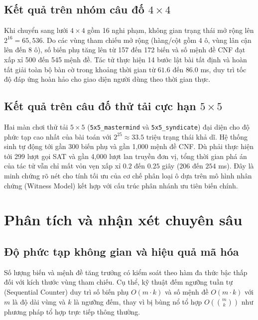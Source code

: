 \subsection{Kết quả trên nhóm câu đố $4 \times 4$}
\label{subsec:ket-qua-4x4}
Khi chuyển sang lưới $4 \times 4$ gồm 16 nghi phạm, không gian trạng thái mở rộng lên $2^{16} = 65,536$. Do các vùng tham chiếu mở rộng (hàng/cột gồm 4 ô, vùng lân cận lên đến 8 ô), số biến phụ tăng lên từ 157 đến 172 biến và số mệnh đề CNF đạt xấp xỉ 500 đến 545 mệnh đề. Tác tử thực hiện 14 bước lật bài tất định và hoàn tất giải toàn bộ bàn cờ trong khoảng thời gian từ $61.6$ đến $86.0$ ms, duy trì tốc độ đáp ứng hoàn hảo cho giao diện người dùng theo thời gian thực.

\subsection{Kết quả trên câu đố thử tải cực hạn $5 \times 5$}
\label{subsec:ket-qua-5x5}
Hai màn chơi thử tải $5 \times 5$ (\texttt{5x5\_mastermind} và \texttt{5x5\_syndicate}) đại diện cho độ phức tạp cao nhất của bài toán với $2^{25} \approx 33.5$ triệu trạng thái khả dĩ. Hệ thống sinh tự động tới gần 300 biến phụ và gần 1,000 mệnh đề CNF. 
Dù phải thực hiện tới 299 lượt gọi SAT và gần 4,000 lượt lan truyền đơn vị, tổng thời gian phá án của tác tử vẫn chỉ mất vỏn vẹn xấp xỉ $0.2$ đến $0.25$ giây ($206$ đến $254$ ms). Đây là minh chứng rõ nét cho tính tối ưu của cơ chế phân loại ô dựa trên mô hình nhân chứng (Witness Model) kết hợp với cấu trúc phân nhánh ưu tiên biến chính.

\section{Phân tích và nhận xét chuyên sâu}
\label{sec:phan-tich-nhan-xet}

\subsection{Độ phức tạp không gian và hiệu quả mã hóa}
Số lượng biến và mệnh đề tăng trưởng có kiểm soát theo hàm đa thức bậc thấp đối với kích thước vùng tham chiếu. Cụ thể, kỹ thuật đếm ngưỡng tuần tự (Sequential Counter) duy trì số biến phụ $O(m \cdot k)$ và số mệnh đề $O(m \cdot k)$ với $m$ là độ dài vùng và $k$ là ngưỡng đếm, thay vì bị bùng nổ tổ hợp $O\left(\binom{m}{k}\right)$ như phương pháp tổ hợp trực tiếp thông thường.

